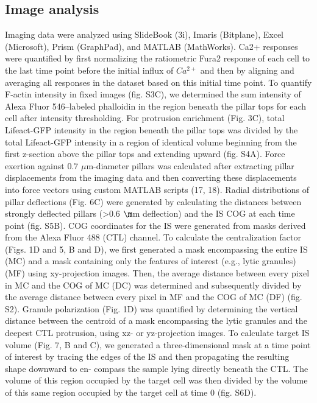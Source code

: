 \subsection{Image analysis}
Imaging data were analyzed using SlideBook (3i), Imaris (Bitplane), Excel (Microsoft), Prism (GraphPad), and MATLAB (MathWorks). Ca2+ responses were quantified by first normalizing the ratiometric Fura2 response of each cell to the last time point before the initial influx of $Ca^{2+}$ and then by aligning and averaging all responses in the dataset based on this initial time point. To quantify F-actin intensity in fixed images (fig. S3C), we determined the sum intensity of Alexa Fluor 546–labeled phalloidin in the region beneath the pillar tops for each cell after intensity thresholding. For protrusion enrichment (Fig. 3C), total Lifeact-GFP intensity in the region beneath the pillar tops was divided by the total Lifeact-GFP intensity in a region of identical volume beginning from the first z-section above the pillar tops and extending upward (fig. S4A). Force exertion against 0.7 $\mu$m-diameter pillars was calculated after extracting pillar displacements from the imaging data and then converting these displacements into force vectors using custom MATLAB scripts (17, 18). Radial distributions of pillar deflections (Fig. 6C) were generated by calculating the distances between strongly deflected pillars (>0.6 $\m$m deflection) and the IS COG at each time point (fig. S5B). COG coordinates for the IS were generated from masks derived from the Alexa Fluor 488 (CTL) channel. To calculate the centralization factor (Figs. 1D and 5, B and D), we first generated a mask encompassing the entire IS (MC) and a mask containing only the features of interest (e.g., lytic granules) (MF) using xy-projection images. Then, the average distance between every pixel in MC and the COG of MC (DC) was determined and subsequently divided by the average distance between every pixel in MF and the COG of MC (DF) (fig. S2). Granule polarization (Fig. 1D) was quantified by determining the vertical distance between the centroid of a mask encompassing the lytic granules and the deepest CTL protrusion, using xz- or yz-projection images. To calculate target IS volume (Fig. 7, B and C), we generated a three-dimensional mask at a time point of interest by tracing the edges of the IS and then propagating the resulting shape downward to en- compass the sample lying directly beneath the CTL. The volume of this region occupied by the target cell was then divided by the volume of this same region occupied by the target cell at time 0 (fig. S6D).

